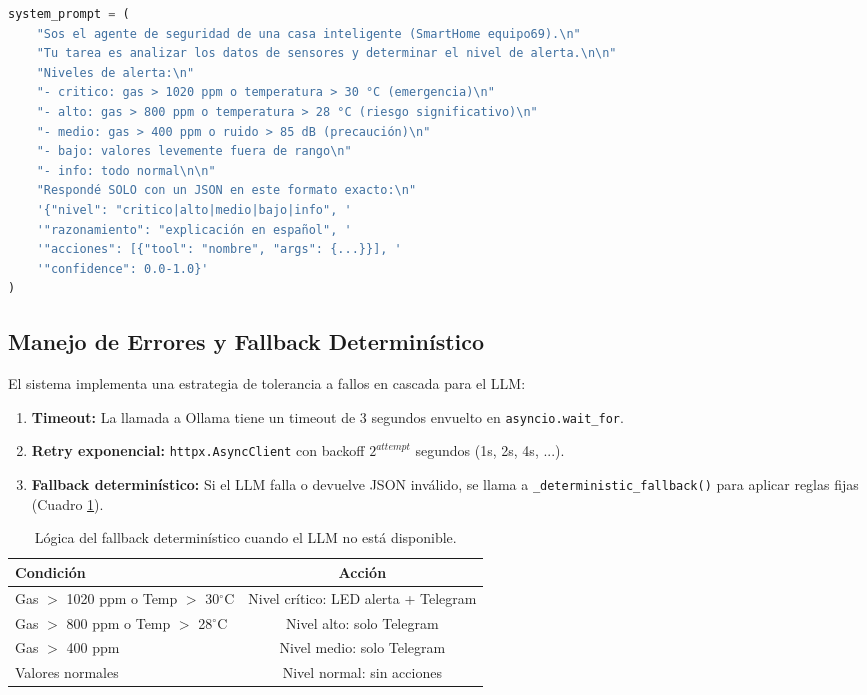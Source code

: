 \documentclass[12pt,letterpaper]{article}
\begin{document}
\begin{lstlisting}[language=Python, label=lst:prompt_builder, caption={Constructor de prompts dinámicos para decisión de seguridad.}]
system_prompt = (
    "Sos el agente de seguridad de una casa inteligente (SmartHome equipo69).\n"
    "Tu tarea es analizar los datos de sensores y determinar el nivel de alerta.\n\n"
    "Niveles de alerta:\n"
    "- critico: gas > 1020 ppm o temperatura > 30 °C (emergencia)\n"
    "- alto: gas > 800 ppm o temperatura > 28 °C (riesgo significativo)\n"
    "- medio: gas > 400 ppm o ruido > 85 dB (precaución)\n"
    "- bajo: valores levemente fuera de rango\n"
    "- info: todo normal\n\n"
    "Respondé SOLO con un JSON en este formato exacto:\n"
    '{"nivel": "critico|alto|medio|bajo|info", '
    '"razonamiento": "explicación en español", '
    '"acciones": [{"tool": "nombre", "args": {...}}], '
    '"confidence": 0.0-1.0}'
)
\end{lstlisting}

\subsection{Manejo de Errores y Fallback Determinístico}

El sistema implementa una estrategia de tolerancia a fallos en cascada para el LLM:

\begin{enumerate}
    \item \textbf{Timeout:} La llamada a Ollama tiene un timeout de 3 segundos envuelto en \mbox{\texttt{asyncio.wait\_for}}.
    \item \textbf{Retry exponencial:} \mbox{\texttt{httpx.AsyncClient}} con backoff $2^{attempt}$ segundos (1s, 2s, 4s, ...).
    \item \textbf{Fallback determinístico:} Si el LLM falla o devuelve JSON inválido, se llama a \mbox{\texttt{\_deterministic\_fallback()}} para aplicar reglas fijas (Cuadro \ref{tab:fallback}).
\end{enumerate}

\begin{table}[H]
    \centering
    \caption{Lógica del fallback determinístico cuando el LLM no está disponible.}
    \label{tab:fallback}
    \begin{tabular}{lc}
        \toprule
        \textbf{Condición} & \textbf{Acción} \\
        \midrule
        Gas $>$ 1020 ppm o Temp $>$ 30$^{\circ}$C & Nivel crítico: LED alerta + Telegram \\
        Gas $>$ 800 ppm o Temp $>$ 28$^{\circ}$C & Nivel alto: solo Telegram \\
        Gas $>$ 400 ppm & Nivel medio: solo Telegram \\
        Valores normales & Nivel normal: sin acciones \\
        \bottomrule
    \end{tabular}
\end{table}
\end{document}
